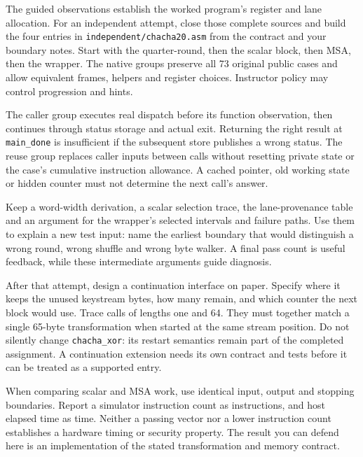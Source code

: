 The guided observations establish the worked program's register and lane
allocation. For an independent attempt, close those complete sources and build
the four entries in \texttt{independent/chacha20.asm} from the contract and your
boundary notes. Start with the quarter-round, then the scalar block, then MSA,
then the wrapper. The native groups preserve all 73 original public cases and
allow equivalent frames, helpers and register choices. Instructor policy may
control progression and hints.

The caller group executes real dispatch before its function observation, then
continues through status storage and actual exit. Returning the right result
at \texttt{main\_done} is insufficient if the subsequent store publishes a
wrong status. The reuse group replaces caller inputs between calls without
resetting private state or the case's cumulative instruction allowance. A
cached pointer, old working state or hidden counter must not determine the
next call's answer.

Keep a word-width derivation, a scalar selection trace, the lane-provenance
table and an argument for the wrapper's selected intervals and failure paths.
Use them to explain a new test input: name the earliest boundary that would
distinguish a wrong round, wrong shuffle and wrong byte walker. A final pass
count is useful feedback, while these intermediate arguments guide diagnosis.

After that attempt, design a continuation interface on paper. Specify where it
keeps the unused keystream bytes, how many remain, and which counter the next
block would use. Trace calls of lengths one and 64. They must together match a
single 65-byte transformation when started at the same stream position.
Do not silently change \texttt{chacha\_xor}: its restart semantics remain part
of the completed assignment. A continuation extension needs its own contract
and tests before it can be treated as a supported entry.

When comparing scalar and MSA work, use identical input, output and stopping
boundaries. Report a simulator instruction count as instructions, and host
elapsed time as time. Neither a passing vector nor a lower instruction count
establishes a hardware timing or security property. The result you can defend
here is an implementation of the stated transformation and memory contract.




